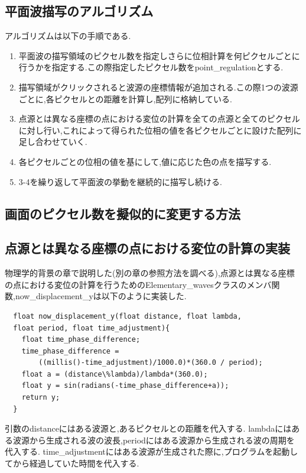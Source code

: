 \subsection{平面波描写のアルゴリズム}
アルゴリズムは以下の手順である.
\begin{enumerate}
 \item 平面波の描写領域のピクセル数を指定しさらに位相計算を何ピクセルごとに行うかを指定する.この際指定したピクセル数をpoint\_regulationとする.
  \item 描写領域がクリックされると波源の座標情報が追加される.この際1つの波源ごとに,各ピクセルとの距離を計算し,配列に格納している.
  \item 点源とは異なる座標の点における変位の計算を全ての点源と全てのピクセルに対し行い,これによって得られた位相の値を各ピクセルごとに設けた配列に足し合わせていく.
  \item 各ピクセルごとの位相の値を基にして,値に応じた色の点を描写する.
 \item 3-4を繰り返して平面波の挙動を継続的に描写し続ける.
 \end{enumerate}

\subsection{画面のピクセル数を擬似的に変更する方法}

\subsection{点源とは異なる座標の点における変位の計算の実装}
物理学的背景の章で説明した(別の章の参照方法を調べる),点源とは異なる座標の点における変位の計算を行うためのElementary\_wavesクラスのメンバ関数,now\_displacement\_yは以下のように実装した.
\begin{screen}
{\small
\begin{verbatim}
  float now_displacement_y(float distance, float lambda, 
  float period, float time_adjustment){
    float time_phase_difference;
    time_phase_difference = 
    	((millis()-time_adjustment)/1000.0)*(360.0 / period);
    float a = (distance\%lambda)/lambda*(360.0);
    float y = sin(radians(-time_phase_difference+a));
    return y;
  }
\end{verbatim}}
\end{screen}

引数のdistanceにはある波源と,あるピクセルとの距離を代入する.
lambdaにはある波源から生成される波の波長,periodにはある波源から生成される波の周期を代入する.
time\_adjustmentにはある波源が生成された際に,プログラムを起動してから経過していた時間を代入する.

